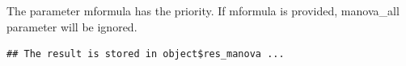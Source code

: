\documentclass[
]{book}
\newenvironment{Shaded}{\begin{snugshade}}{\end{snugshade}}
\newcommand{\AttributeTok}[1]{\textcolor[rgb]{0.77,0.63,0.00}{#1}}
\newcommand{\CommentTok}[1]{\textcolor[rgb]{0.56,0.35,0.01}{\textit{#1}}}
\newcommand{\FunctionTok}[1]{\textcolor[rgb]{0.00,0.00,0.00}{#1}}
\newcommand{\NormalTok}[1]{#1}
\newcommand{\SpecialCharTok}[1]{\textcolor[rgb]{0.00,0.00,0.00}{#1}}
\newcommand{\StringTok}[1]{\textcolor[rgb]{0.31,0.60,0.02}{#1}}
\begin{document}
The parameter mformula has the priority. If mformula is provided, manova\_all parameter will be ignored.

\begin{Shaded}
\end{Shaded}

\begin{verbatim}
## The result is stored in object$res_manova ...
\end{verbatim}
\end{document}
